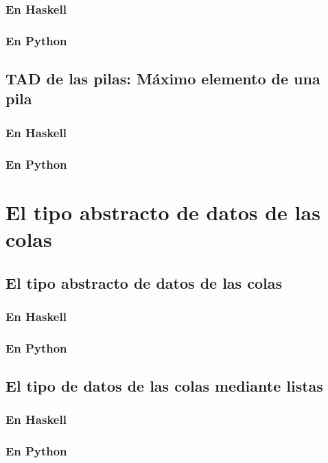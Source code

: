 \documentclass[a4paper,12pt,twoside]{book}
\begin{document}
\subsection{En Haskell}
\subsection{En Python}

\section{TAD de las pilas: Máximo elemento de una pila}
\subsection{En Haskell}
\subsection{En Python}

\chapter{El tipo abstracto de datos de las colas}

\section{El tipo abstracto de datos de las colas}
\subsection{En Haskell}
\subsection{En Python}

\section{El tipo de datos de las colas mediante listas}
\subsection{En Haskell}
\subsection{En Python}
\end{document}
